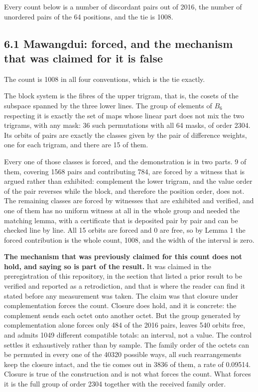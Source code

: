 \documentclass[11pt,a4paper]{article}
\begin{document}
Every count below is a number of discordant pairs out of 2016, the number of unordered pairs of the 64 positions, and the tie is 1008.

\subsection*{6.1 Mawangdui: forced, and the mechanism that was claimed for it is false}

The count is 1008 in all four conventions, which is the tie exactly.

The block system is the fibres of the upper trigram, that is, the cosets of the subspace spanned by the three lower lines. The group of elements of $B_6$ respecting it is exactly the set of maps whose linear part does not mix the two trigrams, with any mask: 36 such permutations with all 64 masks, of order 2304. Its orbits of pairs are exactly the classes given by the pair of difference weights, one for each trigram, and there are 15 of them.

Every one of those classes is forced, and the demonstration is in two parts. 9 of them, covering 1568 pairs and contributing 784, are forced by a witness that is argued rather than exhibited: complement the lower trigram, and the value order of the pair reverses while the block, and therefore the position order, does not. The remaining classes are forced by witnesses that are exhibited and verified, and one of them has no uniform witness at all in the whole group and needed the matching lemma, with a certificate that is deposited pair by pair and can be checked line by line. All 15 orbits are forced and 0 are free, so by Lemma 1 the forced contribution is the whole count, 1008, and the width of the interval is zero.

\textbf{The mechanism that was previously claimed for this count does not hold, and saying so is part of the result.} It was claimed in the preregistration of this repository, in the section that listed a prior result to be verified and reported as a retrodiction, and that is where the reader can find it stated before any measurement was taken. The claim was that closure under complementation forces the count. Closure does hold, and it is concrete: the complement sends each octet onto another octet. But the group generated by complementation alone forces only 484 of the 2016 pairs, leaves 540 orbits free, and admits 1049 different compatible totals: an interval, not a value. The control settles it exhaustively rather than by sample. The family order of the octets can be permuted in every one of the 40320 possible ways, all such rearrangements keep the closure intact, and the tie comes out in 3836 of them, a rate of 0.09514. Closure is true of the construction and is not what forces the count. What forces it is the full group of order 2304 together with the received family order.
\end{document}

